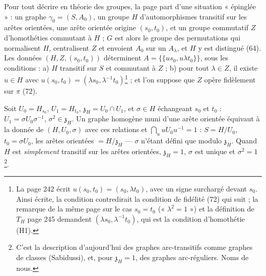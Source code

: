 \documentclass[11pt,a4paper]{article}
\begin{document}
Pour tout décrire en théorie des groupes, la page part d'une situation
« épinglée » : un graphe $\gamma_0 = (S, A_0)$, un groupe $H$ d'automorphismes
transitif sur les arêtes orientées, une arête orientée origine $(s_0, t_0)$, et
un groupe commutatif $Z$ d'homothéties commutant à $H$ ; $G$ est alors le groupe
des permutations qui normalisent $H$, centralisent $Z$ et envoient $A_0$ sur un
$A_\lambda$, et $H$ y est distingué (64). Les données $(H, Z, (s_0, t_0))$
déterminent $A = \{\{u s_0, u\lambda t_0\}\}$, sous les conditions : a) $H$
transitif sur $S$ et commutant à $Z$ ; b) pour tout $\lambda \in Z$, il existe $u
\in H$ avec $u(s_0, t_0) = (\lambda s_0, \lambda^{-1}t_0)$\footnote{La page 242
écrit $u(s_0, t_0) = (s_0, \lambda t_0)$, avec un signe surchargé devant
$s_0$. Ainsi écrite, la condition contredirait la condition de fidélité (72)
qui suit ; la remarque de la même page sur le cas $s_0 = t_0$ (« $\lambda^2 =
1$ ») et la définition de $T_H$ page 245 demandent $(\lambda s_0,
\lambda^{-1}t_0)$, qui est la condition d'homothétie (H1).} ; et l'on suppose
que $Z$ opère fidèlement sur $\pi$ (72).

Soit $U_0 = H_{s_0}$, $U_1 = H_{t_0}$, $\mathfrak{z}_H = U_0 \cap U_1$, et $\sigma
\in H$ échangeant $s_0$ et $t_0$ : $U_1 = \sigma U_0 \sigma^{-1}$, $\sigma^2 \in
\mathfrak{z}_H$. Un graphe homogène muni d'une arête orientée équivaut à la
donnée de $(H, U_0, \sigma)$ avec ces relations et $\bigcap_u uU_0u^{-1} = 1$ :
$S = H/U_0$, $t_0 = \sigma U_0$, les arêtes orientées $= H/\mathfrak{z}_H$ ---
$\sigma$ n'étant défini que modulo $\mathfrak{z}_H$. Quand $H$ est
\emph{simplement} transitif sur les arêtes orientées, $\mathfrak{z}_H = 1$,
$\sigma$ est unique et $\sigma^2 = 1$\footnote{C'est la description
d'aujourd'hui des graphes arc-transitifs comme graphes de classes (Sabidussi),
et, pour $\mathfrak{z}_H = 1$, des graphes arc-réguliers. Noms de nous.}.
\end{document}
